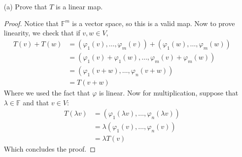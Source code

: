 \documentclass{article}
\begin{document}
\begin{enumerate}
	\item [(a)] Prove that $T$ is a linear map.
		\begin{proof}
			Notice that $\mathbb{F}^{m}$ is a vector space, so this is a valid map. Now to prove linearity, we check that if $v, w \in V$, 
			\begin{align*}
				T(v) + T(w) &= (\varphi_{1}(v), \ldots, \varphi_{m}(v)) + (\varphi_{1}(w), \ldots, \varphi_{m}(w)) \\
					    &= (\varphi_{1}(v) + \varphi_{1}(w), \ldots, \varphi_{m}(v) + \varphi_{m}(w)) \\
					    &= (\varphi_{1}(v + w), \ldots, \varphi_{n}(v + w)) \\
					    &= T(v + w)
			\end{align*}
			Where we used the fact that $\varphi$ is linear. Now for multiplication, suppose that $\lambda \in \mathbb{F}$ and that $v \in V$:
			\begin{align*}
				T(\lambda v) &= (\varphi_{1}(\lambda v), \ldots, \varphi_{n}(\lambda v))\\
					     &= \lambda(\varphi_{1}(v), \ldots, \varphi_{n}(v)) \\
					     &= \lambda T(v)
			\end{align*}
			Which concludes the proof.
		\end{proof}
	

\end{enumerate}
\end{document}

